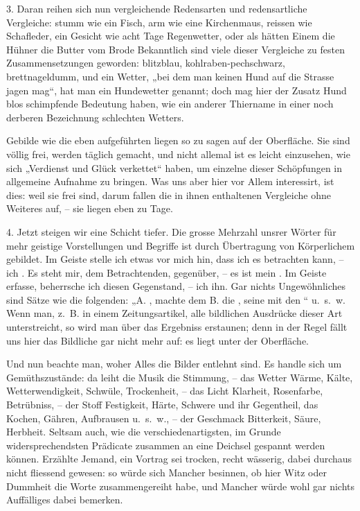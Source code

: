 3. Daran reihen sich nun vergleichende Redensarten und redensartliche Vergleiche: stumm wie ein Fisch, arm wie eine Kirchenmaus, reissen wie Schafleder, ein Gesicht wie acht Tage Regenwetter, oder als hätten Einem die Hühner die Butter vom Brode  Bekanntlich sind viele dieser Vergleiche zu festen Zusammensetzungen geworden: blitzblau, kohlraben-pechschwarz, brettnageldumm,  und ein Wetter, „bei dem man keinen Hund auf die Strasse jagen mag“, hat man ein Hundewetter genannt; doch mag hier der Zusatz Hund blos schimpfende Bedeutung haben, wie ein anderer Thiername in einer noch derberen Bezeichnung schlechten Wetters.

Gebilde wie die eben aufgeführten liegen so zu sagen auf der Oberfläche. Sie sind völlig frei, werden täglich gemacht, und nicht allemal ist es leicht einzusehen, wie sich „Verdienst und Glück verkettet“ haben, um einzelne dieser Schöpfungen in allgemeine Aufnahme zu bringen. Was uns aber hier vor Allem interessirt, ist dies: weil sie frei sind, darum fallen die in ihnen enthaltenen Vergleiche ohne Weiteres auf, – sie liegen eben zu Tage.

4. Jetzt steigen wir eine Schicht tiefer. Die grosse Mehrzahl unsrer Wörter \label{sp.43} für mehr geistige Vorstellungen und Begriffe ist durch Übertragung von Körperlichem gebildet. Im Geiste stelle ich etwas vor mich hin, dass ich es betrachten kann, – ich . Es steht mir, dem Betrachtenden, gegenüber, – es ist mein . Im Geiste erfasse, beherrsche ich diesen Gegenstand, – ich  ihn. \label{fp.43} Gar nichts Ungewöhnliches sind Sätze wie die folgenden: „A. , machte dem B. die ,  seine  mit den “ u.~s.~w. Wenn man, z.~B. in einem Zeitungsartikel, alle bildlichen Ausdrücke dieser Art unterstreicht, so wird man über das Ergebniss erstaunen; denn in der Regel fällt uns hier das Bildliche gar nicht mehr auf: es liegt unter der Oberfläche.

Und nun beachte man, woher Alles die Bilder entlehnt sind. Es handle sich um Gemüthszustände: da leiht die Musik die Stimmung, – das Wetter Wärme, Kälte, Wetterwendigkeit, Schwüle, Trockenheit, – das Licht Klarheit, Rosenfarbe, Betrübniss, – der Stoff Festigkeit, Härte, Schwere und ihr Gegentheil, das Kochen, Gähren, Aufbrausen u.~s.~w., – der Geschmack Bitterkeit, Säure, Herbheit. Seltsam auch, wie die verschiedenartigsten, im Grunde widersprechendsten Prädicate zusammen an eine Deichsel gespannt werden können. Erzählte Jemand, ein Vortrag sei trocken, recht wässerig, dabei durchaus nicht fliessend gewesen: so würde sich Mancher besinnen, ob hier Witz oder Dummheit die Worte zusammengereiht habe, und Mancher würde wohl gar nichts Auffälliges dabei bemerken.

